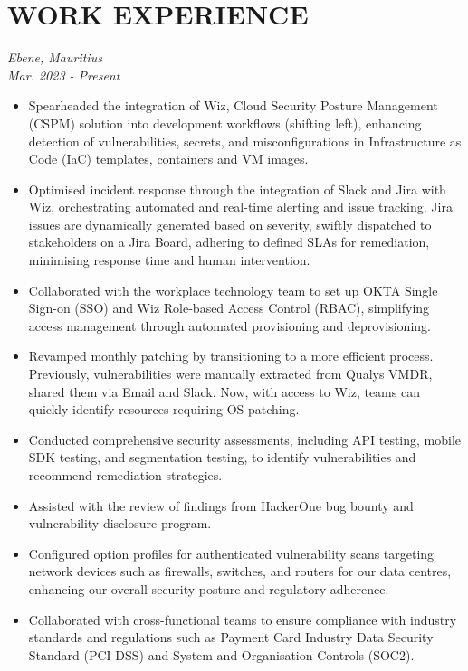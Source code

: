 \documentclass[a4paper, fleqn, oneside]{article}
\begin{document}
\section{WORK EXPERIENCE}
\label{sec:org1732c3d}
{ \hfill \textit{Ebene, Mauritius}} \\
{ \hfill {\textit{Mar. 2023 - Present}}}
\begin{itemize}
\item Spearheaded the integration of Wiz, Cloud Security Posture Management (CSPM) solution into development workflows (shifting left), enhancing detection of vulnerabilities, secrets, and misconfigurations in Infrastructure as Code (IaC) templates, containers and VM images.
\item Optimised incident response through the integration of Slack and Jira with Wiz, orchestrating automated and real-time alerting and issue tracking. Jira issues are dynamically generated based on severity, swiftly dispatched to stakeholders on a Jira Board, adhering to defined SLAs for remediation, minimising response time and human intervention.
\item Collaborated with the workplace technology team to set up OKTA Single Sign-on (SSO) and Wiz Role-based Access Control (RBAC), simplifying access management through automated provisioning and deprovisioning.
\item Revamped monthly patching by transitioning to a more efficient process. Previously, vulnerabilities were manually extracted from Qualys VMDR, shared them via Email and Slack. Now, with access to Wiz, teams can quickly identify resources requiring OS patching.
\item Conducted comprehensive security assessments, including API testing, mobile SDK testing, and segmentation testing, to identify vulnerabilities and recommend remediation strategies.
\item Assisted with the review of findings from HackerOne bug bounty and vulnerability disclosure program.
\item Configured option profiles for authenticated vulnerability scans targeting network devices such as firewalls, switches, and routers for our data centres, enhancing our overall security posture and regulatory adherence.
\item Collaborated with cross-functional teams to ensure compliance with industry standards and regulations such as Payment Card Industry Data Security Standard (PCI DSS) and System and Organisation Controls (SOC2).
\end{itemize}
\end{document}

